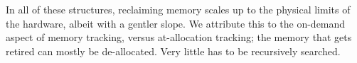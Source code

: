 In all of these structures, reclaiming memory scales up to the physical limits of the hardware, albeit with a gentler slope.  We attribute this to the on-demand aspect of memory tracking, versus at-allocation tracking; the memory that gets retired can mostly be de-allocated. Very little has to be recursively searched.

